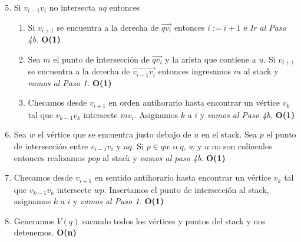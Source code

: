 \documentclass[aspectratio=169,xcolor=dvipsnames, t]{beamer}
\begin{document}
\begin{frame}{}
    \begin{enumerate}
     \setcounter{enumi}{4} 
            \item Si $v_{i-1}v_{i}$ no intersecta $uq$ entonces
                \begin{enumerate}
                    \item Si $v_{i+1}$ se encuentra a la derecha de $\overrightarrow{qv_{i}}$ entonces $i := i + 1$ e \textit{Ir al Paso 4b.} \textbf{O(1)}
                    \item Sea $m$ el punto de intersección de $\overrightarrow{qv_{i}}$ y la arista que contiene a $u$. Si $v_{i+1}$ se encuentra a la derecha de $\overrightarrow{v_{i-1}v_{i}}$ entonces ingresamos $m$ al stack y \textit{vamos al Paso 1.} \textbf{O(1)}
                    \item Checamos desde $v_{i+1}$ en orden antihorario hasta encontrar un vértice $v_{k}$ tal que $v_{k-1}v_{k}$ intersecte $mv_{i}$. Asignamos $k$ a $i$ y \textit{vamos al Paso 4b.} \textbf{O(1)}
                \end{enumerate}
            \item Sea $w$ el vértice que se encuentra justo debajo de $u$ en el stack. Sea $p$ el punto de intersección entre $v_{i-1}v_{i}$ y $uq$. Si $p \in qw$ o $q$, $w$ y $u$ no son colineales entonces realizamos \textit{pop} al stack y \textit{vamos al paso 4b}. \textbf{O(1)}
            \item Checamos desde $v_{i+1}$ en sentido antihorario hasta encontrar un vértice $v_{k}$ tal que $v_{k-1}v_{k}$ intersecte $wp$. Insertamos el punto de intersección al stack, asignamos $k$ a $i$ y \textit{vamos al Paso 1.} \textbf{O(1)}
            \item Generamos $V(q)$ sacando todos los vértices y puntos del stack y nos detenemos. \textbf{O(n)}
    \end{enumerate}
\end{frame}



\makefinalpage
\end{document}
